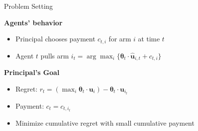 \documentclass[serif]{beamer}
\begin{document}
\begin{frame}{Problem Setting}

\textbf{Agents' behavior}
\begin{itemize}[label=\textbullet]
\item Principal chooses payment $c_{t,i}$ for arm $i$ at time $t$
\item Agent $t$ pulls arm $i_t = \arg\max_{i}\{\bm{\theta}_{t}\cdot \hat{\bm{u}}_{i,t}+c_{t,i}\}$
\end{itemize}


\vspace{0.5cm}

\textbf{Principal's Goal}
\begin{itemize}[label=\textbullet]
\item Regret: $r_t = (\max_{i} \bm{\theta}_t \cdot \bm{u}_i) - \bm{\theta}_t \cdot \bm{u}_{i_t}$
\item Payment: $c_t = c_{t,i_t}$
\item Minimize cumulative regret with small cumulative payment
\end{itemize}

\end{frame}



\end{document}
